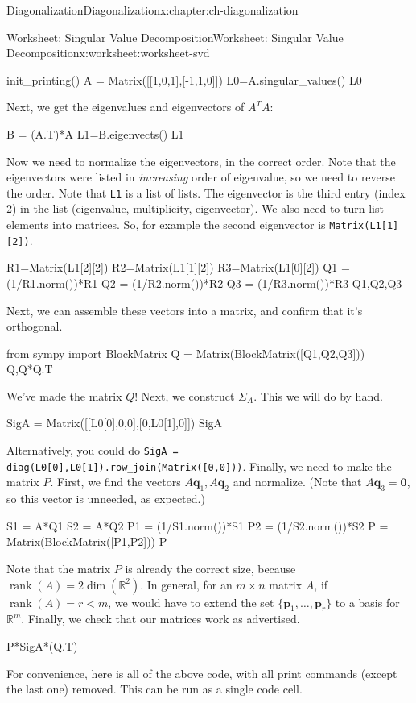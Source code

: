 \documentclass[oneside,10pt,]{book}
\newcommand{\mono}[1]{\texttt{#1}}
\numberwithin{equation}{section}
\newcommand{\R}{\mathbb{R}}
\newcommand{\rank}{\operatorname{rank}}
\newcommand{\zer}{\mathbf{0}}
\newcommand{\vecq}{\mathbf{q}}
\newcommand{\vecp}{\mathbf{p}}
\newcommand{\lt}{<}
\begin{document}
\begin{chapterptx}{Diagonalization}{}{Diagonalization}{}{}{x:chapter:ch-diagonalization}
\begin{worksheet-section}{Worksheet: Singular Value Decomposition}{}{Worksheet: Singular Value Decomposition}{}{}{x:worksheet:worksheet-svd}
\begin{sageinput}
init_printing()
A = Matrix([[1,0,1],[-1,1,0]])
L0=A.singular_values()
L0
\end{sageinput}
Next, we get the eigenvalues and eigenvectors of \(A^TA\):%
\begin{sageinput}
B = (A.T)*A
L1=B.eigenvects()
L1
\end{sageinput}
Now we need to normalize the eigenvectors, in the correct order. Note that the eigenvectors were listed in \emph{increasing} order of eigenvalue, so we need to reverse the order. Note that \mono{L1} is a list of lists. The eigenvector is the third entry (index 2) in the list (eigenvalue, multiplicity, eigenvector). We also need to turn list elements into matrices. So, for example the second eigenvector is \mono{Matrix(L1[1][2])}.%
\begin{sageinput}
R1=Matrix(L1[2][2])
R2=Matrix(L1[1][2])
R3=Matrix(L1[0][2])
Q1 = (1/R1.norm())*R1
Q2 = (1/R2.norm())*R2
Q3 = (1/R3.norm())*R3
Q1,Q2,Q3
\end{sageinput}
\clearpage
Next, we can assemble these vectors into a matrix, and confirm that it's orthogonal.%
\begin{sageinput}
from sympy import BlockMatrix
Q = Matrix(BlockMatrix([Q1,Q2,Q3]))
Q,Q*Q.T
\end{sageinput}
We've made the matrix \(Q\)! Next, we construct \(\Sigma_A\). This we will do by hand.%
\begin{sageinput}
SigA = Matrix([[L0[0],0,0],[0,L0[1],0]])
SigA
\end{sageinput}
Alternatively, you could do \mono{SigA = diag(L0[0],L0[1]).row\_join(Matrix([0,0]))}. Finally, we need to make the matrix \(P\). First, we find the vectors \(A\vecq_1, A\vecq_2\) and normalize. (Note that \(A\vecq_3=\zer\), so this vector is unneeded, as expected.)%
\begin{sageinput}
S1 = A*Q1
S2 = A*Q2
P1 = (1/S1.norm())*S1
P2 = (1/S2.norm())*S2
P = Matrix(BlockMatrix([P1,P2]))
P
\end{sageinput}
Note that the matrix \(P\) is already the correct size, because \(\rank(A)=2\dim(\R^2)\). In general, for an \(m\times n\) matrix \(A\), if \(\rank(A)=r\lt m\), we would have to extend the set \(\{\vecp_1,\ldots, \vecp_r\}\) to a basis for \(\R^m\). Finally, we check that our matrices work as advertised.%
\begin{sageinput}
P*SigA*(Q.T)
\end{sageinput}
For convenience, here is all of the above code, with all print commands (except the last one) removed. This can be run as a single code cell.%

\end{worksheet-section}
\end{chapterptx}
\end{document}
